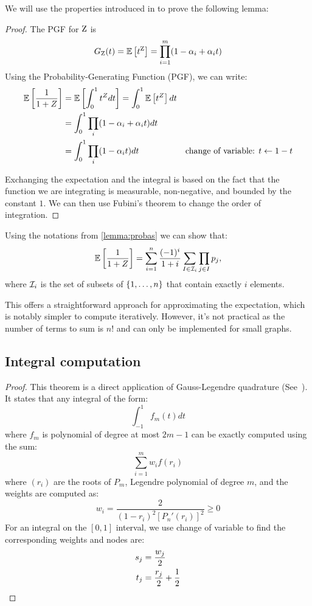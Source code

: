 We will use the properties introduced in  to prove the
following lemma: \poissonexpect*
\begin{proof}
	The PGF for ${\textnormal{Z}}$ is
	\[
		G_{\textnormal{Z}}(t) = \mathbb{E}\left[t^{\textnormal{Z}}\right] = \prod_{i=1}^m (1-\alpha_i+\alpha_i t)
	\]
	Using the Probability-Generating Function (PGF), we can write:
	\begin{align*}
		\mathbb{E}\left[{\frac{1}{1 + Z}}\right]
		 & =\mathbb{E}\left[\int_{0}^{1} t^Z dt\right]
		= \int_{0}^{1} \mathbb{E}\left[t^Z\right]dt
		 &                                                                                                 \\
		 & = \int_{0}^{1} \prod_i (1-\alpha_i+\alpha_i t)dt &                                              \\
		 & = \int_{0}^{1} \prod_i (1-\alpha_i t)dt          & \text{change of variable: }  t\leftarrow 1-t \\
	\end{align*}

	Exchanging the expectation and the integral is based on the fact that the
	function we are integrating is measurable, non-negative, and bounded by the
	constant \(1\). We can then use Fubini's theorem to change the order of
	integration.
\end{proof}

\begin{corollary}
	Using the notations from \cref{lemma:probas} we can show that:
	\begin{align*}
		\mathbb{E}\left[{\frac{1}{1 + Z}}\right]  = \sum_{i=1}^{n} \frac{(-1)^i}{1+i} \sum_{I\in{\mathcal{I}}_i} \prod_{j\in I} p_j,
	\end{align*}
	where ${\mathcal{I}}_i$ is the set of subsets of $\left\lbrace1,\ldots,n\right\rbrace$ that contain exactly
	$i$ elements.
\end{corollary}

This offers a straightforward approach for approximating the expectation, which is
notably simpler to compute iteratively. However, it's not practical as the number
of terms to sum is $n!$ and can only be implemented for small graphs.

\subsection{Integral computation}
\label{appendix:integralcompute}
\integralcompute*
\begin{proof}
	This theorem is a direct application of Gauss-Legendre quadrature (See~\citet{numericalanalysis}). It
	states that any integral of the form:
	\[
		\int_{-1}^{1} f_m(t)dt
	\]
	where $f_m$ is polynomial of degree at most $2m-1$ can be exactly computed
	using the sum:
	\[
		\sum_{i=1}^{m} w_i f(r_i)
	\]
	where $(r_i)$ are the roots of $P_m$, Legendre polynomial of degree $m$, and
	the weights are computed as:
	\[
		w_i = \frac{2}{(1-r_i)^2 [P_n'(r_i)]^2}\geq 0
	\]
	For an integral on the $[0,1]$ interval, we use change of variable to find the
	corresponding weights and nodes are:
	\begin{align*}
		s_j & = \frac{w_j}{2}          \\
		t_j & = \frac{r_j}{2} + {\frac{1}{2}}
	\end{align*}
\end{proof}

